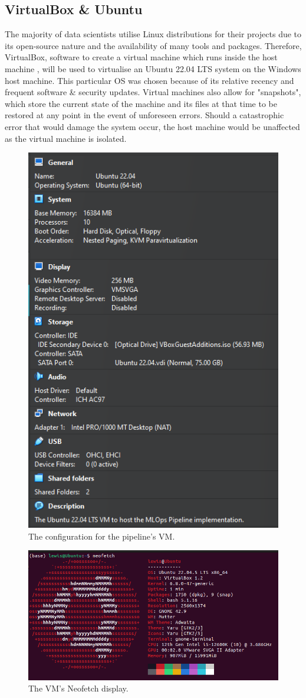 \documentclass[12pt]{report}
\begin{document}
\subsection{VirtualBox \& Ubuntu}
The majority of data scientists utilise Linux distributions for their projects due to its open-source nature and the 
availability of many tools and packages. Therefore, VirtualBox, software to create a virtual machine which runs inside the host 
machine \autocite{oracle_oracle_nodate}, will be used to virtualise an Ubuntu 22.04 LTS system on the Windows host machine. This 
particular OS was chosen because of its relative recency and frequent software \& security updates. Virtual machines
also allow for "snapshots", which store the current state of the machine and its files at that time to be restored at any point in the 
event of unforeseen errors. Should a catastrophic error that would damage the system occur, the host machine would be unaffected as the 
virtual machine is isolated.

\begin{figure}[H]
    \centering
    \includegraphics[width=.5\linewidth]{Implementation/VBoxConfig.png}
    \caption{The configuration for the pipeline's VM.}
    \label{fig:VBoxConfig}
\end{figure}

\begin{figure}[H]
    \centering
    \includegraphics[width=.75\linewidth]{Implementation/Neofetch.png}
    \caption{The VM's Neofetch display.}
    \label{fig:Neofetch}
\end{figure}
\end{document}
